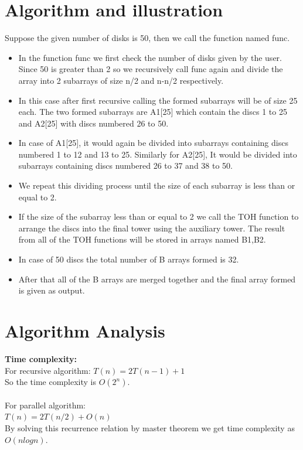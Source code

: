 \documentclass[conference]{IEEEtran}
\begin{document}
\section{Algorithm and illustration}
Suppose the given number of disks is 50, then we call the function named func.
\begin{itemize}
\item In the function func we first check the number of disks given by the user. Since 50 is greater than 2 so we recursively call func again and divide the array into 2 subarrays of size n/2 and n-n/2 respectively. 
\item In this case after first recursive calling the formed subarrays will be of size 25 each.
The two formed subarrays are A1[25] which contain the discs 1 to 25 and A2[25] with discs numbered 26 to 50.
\item In case of A1[25], it would again be divided into subarrays containing discs numbered 1 to 12 and 13 to 25.
Similarly for A2[25], It would be divided into subarrays containing discs numbered 26 to 37 and 38 to 50.
\item We repeat this dividing process until the size of each subarray is less than or equal to 2.
\item If the size of the subarray less than or equal to 2 we call the TOH function to arrange the discs into the final tower using the auxiliary tower.
The result from all of the TOH functions will be stored in arrays named B1,B2.
\item In case of 50 discs the total number of B arrays formed is 32.
\item After that all of the B arrays are merged together and the final array formed is given as output.\\
\end{itemize}

\section{Algorithm Analysis}
\textbf{Time complexity:}\\
For recursive algorithm: 
$T(n)=2T(n-1)+1$\\
So the time complexity is $O(2^n)$.\\\\
For parallel algorithm:\\
$T(n) = 2T(n/2) + O(n)$\\
By solving this recurrence relation by master theorem we get time complexity as $O(nlogn)$.\\
\end{document}
